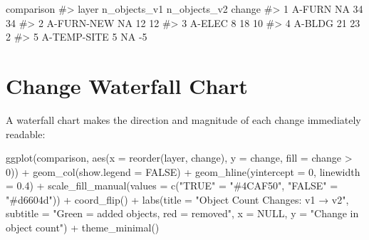 \documentclass[
  11pt,
  letterpaper,
  DIV=11,
  numbers=noendperiod]{scrreprt}
\newenvironment{Shaded}{\begin{snugshade}}{\end{snugshade}}
\newcommand{\AttributeTok}[1]{\textcolor[rgb]{0.40,0.45,0.13}{#1}}
\newcommand{\CommentTok}[1]{\textcolor[rgb]{0.37,0.37,0.37}{#1}}
\newcommand{\ConstantTok}[1]{\textcolor[rgb]{0.56,0.35,0.01}{#1}}
\newcommand{\DecValTok}[1]{\textcolor[rgb]{0.68,0.00,0.00}{#1}}
\newcommand{\FloatTok}[1]{\textcolor[rgb]{0.68,0.00,0.00}{#1}}
\newcommand{\FunctionTok}[1]{\textcolor[rgb]{0.28,0.35,0.67}{#1}}
\newcommand{\NormalTok}[1]{\textcolor[rgb]{0.00,0.23,0.31}{#1}}
\newcommand{\OtherTok}[1]{\textcolor[rgb]{0.00,0.23,0.31}{#1}}
\newcommand{\SpecialCharTok}[1]{\textcolor[rgb]{0.37,0.37,0.37}{#1}}
\newcommand{\StringTok}[1]{\textcolor[rgb]{0.13,0.47,0.30}{#1}}
\begin{document}
\begin{Shaded}
\begin{Highlighting}[]
\NormalTok{comparison}
\CommentTok{\#\textgreater{}         layer n\_objects\_v1 n\_objects\_v2 change}
\CommentTok{\#\textgreater{} 1      A{-}FURN           NA           34     34}
\CommentTok{\#\textgreater{} 2  A{-}FURN{-}NEW           NA           12     12}
\CommentTok{\#\textgreater{} 3    A{-}ELEC             8           18     10}
\CommentTok{\#\textgreater{} 4    A{-}BLDG            21           23      2}
\CommentTok{\#\textgreater{} 5  A{-}TEMP{-}SITE         5           NA     {-}5}
\end{Highlighting}
\end{Shaded}

\section{Change Waterfall Chart}\label{change-waterfall-chart}

A waterfall chart makes the direction and magnitude of each change
immediately readable:

\begin{Shaded}
\begin{Highlighting}[]
\FunctionTok{ggplot}\NormalTok{(comparison,}
       \FunctionTok{aes}\NormalTok{(}\AttributeTok{x =} \FunctionTok{reorder}\NormalTok{(layer, change),}
           \AttributeTok{y =}\NormalTok{ change,}
           \AttributeTok{fill =}\NormalTok{ change }\SpecialCharTok{\textgreater{}} \DecValTok{0}\NormalTok{)) }\SpecialCharTok{+}
  \FunctionTok{geom\_col}\NormalTok{(}\AttributeTok{show.legend =} \ConstantTok{FALSE}\NormalTok{) }\SpecialCharTok{+}
  \FunctionTok{geom\_hline}\NormalTok{(}\AttributeTok{yintercept =} \DecValTok{0}\NormalTok{, }\AttributeTok{linewidth =} \FloatTok{0.4}\NormalTok{) }\SpecialCharTok{+}
  \FunctionTok{scale\_fill\_manual}\NormalTok{(}\AttributeTok{values =} \FunctionTok{c}\NormalTok{(}\StringTok{"TRUE"} \OtherTok{=} \StringTok{"\#4CAF50"}\NormalTok{, }\StringTok{"FALSE"} \OtherTok{=} \StringTok{"\#d6604d"}\NormalTok{)) }\SpecialCharTok{+}
  \FunctionTok{coord\_flip}\NormalTok{() }\SpecialCharTok{+}
  \FunctionTok{labs}\NormalTok{(}\AttributeTok{title =} \StringTok{"Object Count Changes: v1 → v2"}\NormalTok{,}
       \AttributeTok{subtitle =} \StringTok{"Green = added objects, red = removed"}\NormalTok{,}
       \AttributeTok{x =} \ConstantTok{NULL}\NormalTok{, }\AttributeTok{y =} \StringTok{"Change in object count"}\NormalTok{) }\SpecialCharTok{+}
  \FunctionTok{theme\_minimal}\NormalTok{()}
\end{Highlighting}
\end{Shaded}
\end{document}
